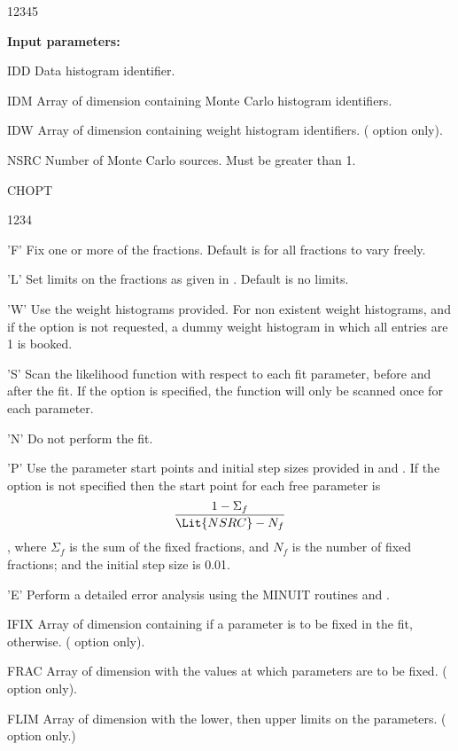 \begin{changebar}
\begin{DLtt}{12345}
\item[{\rm\bf Input parameters:}]
\item[IDD] Data histogram identifier.
\item[IDM] Array of dimension  containing Monte Carlo histogram
identifiers.
\item[IDW] Array of dimension  containing weight histogram
identifiers. ( option only).
\item[NSRC] Number of Monte Carlo sources.  Must be greater than 1.
\item[CHOPT]
\begin{DLtt}{1234}
\item['F'] Fix one or more of the fractions.  Default is for all fractions
to vary freely.
\item['L'] Set limits on the fractions as given in .  Default
is no limits.
\item['W'] Use the weight histograms provided.  For non existent weight
histograms, and if the  option is not requested, a dummy weight
histogram in which all entries are 1 is booked.
\item['S'] Scan the likelihood function with respect to each fit parameter,
before and after the fit.  If the  option is specified, the function
will only be scanned once for each parameter.
\item['N'] Do not perform the fit.
\item['P'] Use the parameter start points and initial step sizes provided
in  and .
If the  option is
not specified then the start point for each free parameter is
\[ \frac{1 - \Sigma_{f}}{\Lit{NSRC}-N_{f}} \], where $\Sigma_{f}$ is the sum
of the fixed fractions, and $N_{f}$ is the number of fixed fractions;
and the initial step size is 0.01.
\item['E'] Perform a detailed error analysis using the MINUIT routines
 and .
\end{DLtt}
\item[IFIX] Array of dimension  containing  if a
parameter is to be fixed in the fit,  otherwise. ( option
only).
\item[FRAC] Array of dimension  with the values at which
parameters are to be fixed. ( option only).
\item[FLIM] Array of dimension  with the lower, then
upper limits on the parameters. ( option only.)

\end{DLtt}
\end{changebar}

